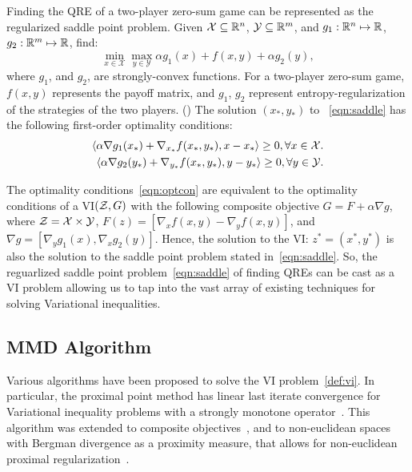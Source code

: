 Finding the QRE of a two-player zero-sum game can be represented as the regularized saddle point
problem.
Given $\mathcal{X} \subseteq \mathbb{R}^n$, $\mathcal{Y} \subseteq \mathbb{R}^m$, and $g_1: \mathbb{R}^n \mapsto \mathbb{R}$, $g_2: \mathbb{R}^m
	\mapsto \mathbb{R}$, find:
\begin{equation}
	\label{eqn:saddle} \min_{x \in \mathcal{X}} \max_{y \in
		\mathcal{Y}} \alpha g_1(x) + f(x, y) + \alpha g_2(y),
\end{equation} where $g_1$, and $g_2$, are
strongly-convex functions.
For a two-player zero-sum game, $f(x, y)$ represents the payoff matrix, and $g_1$, $g_2$ represent
entropy-regularization of the strategies of the two players.
()
The
solution $(x_{\ast}, y_{\ast})$ to~ \ref{eqn:saddle} has the following first-order optimality conditions:
\begin{equation}
	\label{eqn:optcon}
	\begin{split}
		\langle \alpha
		\nabla g_1(x_*) + \nabla_{x_*} f(x_*, y_*), x - x_* \rangle \geq 0, \forall x \in \mathcal{X}.
		\\
		\langle \alpha \nabla g_2(y_*) +
		\nabla_{y_*} f(x_*, y_*),
		y - y_* \rangle \geq 0, \forall y \in \mathcal{Y}.
	\end{split}
\end{equation}

The optimality conditions~\ref{eqn:optcon} are equivalent to the optimality conditions of a
VI$(\mathcal{Z}, G)$ with the following composite objective $G = F + \alpha \nabla g$, where $\mathcal{Z} =
	\mathcal{X} \times \mathcal{Y}$, $F(z) = [\nabla_x f(x,y) - \nabla_y f(x,y)]$, and $\nabla g =
	[\nabla_y g_1(x), \nabla_x g_2(y)]$.
Hence, the solution to the VI: $z^* = (x^*, y^*)$ is also the solution to the saddle point problem
stated in~\ref{eqn:saddle}.
So, the reguarlized saddle point problem~\ref{eqn:saddle} of finding QREs can be cast as a VI
problem allowing us to tap into the vast array of existing techniques for solving Variational
inequalities.

\subsection{MMD Algorithm}
Various algorithms have been proposed to solve the VI problem~\ref{def:vi}.
In particular, the proximal point method has linear last iterate convergence for Variational
inequality problems with a strongly monotone operator~\cite{rockafellarMonotone1976}.
This algorithm was extended to composite objectives~\cite{tsenglinear1995}, and to non-euclidean
spaces with Bergman divergence as a proximity measure, that allows for non-euclidean proximal
regularization~\cite{tsengApproximation2010}.

